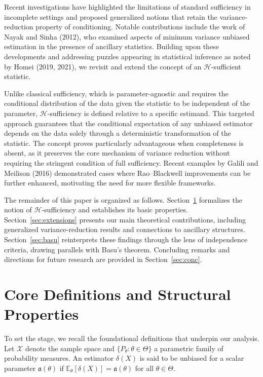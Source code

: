 \documentclass[twoside]{article}
\begin{document}
Recent investigations have highlighted the limitations of standard sufficiency in incomplete settings and proposed generalized notions that retain the variance-reduction property of conditioning. Notable contributions include the work of Nayak and Sinha (2012), who examined aspects of minimum variance unbiased estimation in the presence of ancillary statistics. Building upon these developments and addressing puzzles appearing in statistical inference as noted by Homei (2019, 2021), we revisit and extend the concept of an $\mathscr{H}$-sufficient statistic.

Unlike classical sufficiency, which is parameter-agnostic and requires the conditional distribution of the data given the statistic to be independent of the parameter, $\mathscr{H}$-sufficiency is defined relative to a specific estimand. This targeted approach guarantees that the conditional expectation of any unbiased estimator depends on the data solely through a deterministic transformation of the statistic. The concept proves particularly advantageous when completeness is absent, as it preserves the core mechanism of variance reduction without requiring the stringent condition of full sufficiency. Recent examples by Galili and Meilison (2016) demonstrated cases where Rao--Blackwell improvements can be further enhanced, motivating the need for more flexible frameworks.

The remainder of this paper is organized as follows. Section~\ref{sec:defs} formalizes the notion of $\mathscr{H}$-sufficiency and establishes its basic properties. Section~\ref{sec:extensions} presents our main theoretical contributions, including generalized variance-reduction results and connections to ancillary structures. Section~\ref{sec:basu} reinterprets these findings through the lens of independence criteria, drawing parallels with Basu's theorem. Concluding remarks and directions for future research are provided in Section~\ref{sec:conc}.

\section{Core Definitions and Structural Properties}\label{sec:defs}
To set the stage, we recall the foundational definitions that underpin our analysis. Let $\mathcal{X}$ denote the sample space and $\{P_{\theta} : \theta \in \Theta\}$ a parametric family of probability measures. An estimator $\delta(X)$ is said to be unbiased for a scalar parameter $\mathfrak{a}(\theta)$ if $\mathbb{E}_{\theta}[\delta(X)] = \mathfrak{a}(\theta)$ for all $\theta \in \Theta$.
\end{document}
